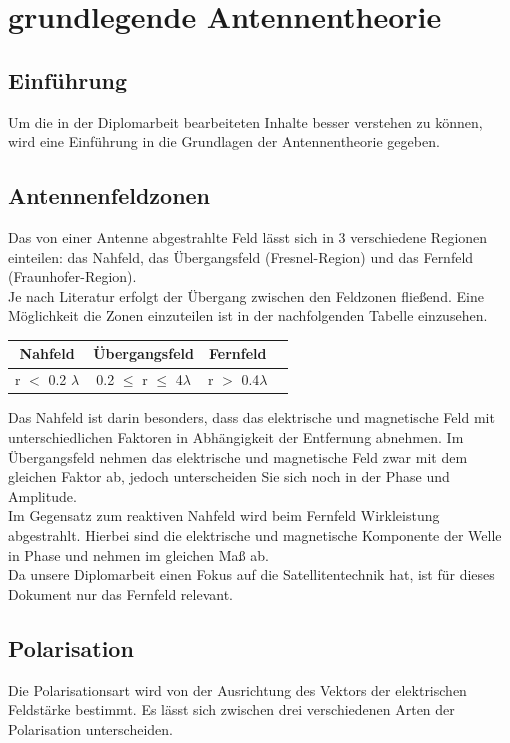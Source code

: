 \section{grundlegende Antennentheorie}
\label{sec:basic-ant}
\subsection{Einführung}
Um die in der Diplomarbeit bearbeiteten Inhalte besser verstehen zu können, wird eine Einführung in die Grundlagen der Antennentheorie gegeben. 

\subsection{Antennenfeldzonen}
Das von einer Antenne abgestrahlte Feld lässt sich in 3 verschiedene Regionen einteilen: das Nahfeld, das Übergangsfeld (Fresnel-Region) und das Fernfeld (Fraunhofer-Region).\\
\newline
Je nach Literatur erfolgt der Übergang zwischen den Feldzonen fließend. Eine Möglichkeit die Zonen einzuteilen ist in der nachfolgenden Tabelle einzusehen.

\begin{center}
	\begin{tabular}[h]{|c|c|c| p{}}
		\hline
		Nahfeld & Übergangsfeld & Fernfeld\\
		\hline
		r $<$ 0.2 $\lambda$ & 0.2 $\leq$ r $\leq$ 4$\lambda$ & r $>$ 0.4$\lambda$\\
		\hline
	\end{tabular}
\end{center}

Das Nahfeld ist darin besonders, dass das elektrische und magnetische Feld mit unterschiedlichen Faktoren in Abhängigkeit der Entfernung abnehmen. Im Übergangsfeld nehmen das elektrische und magnetische Feld zwar mit dem gleichen Faktor ab, jedoch unterscheiden Sie sich noch in der Phase und Amplitude.\\
\newline
Im Gegensatz zum reaktiven Nahfeld wird beim Fernfeld Wirkleistung abgestrahlt. Hierbei sind die elektrische und magnetische Komponente der Welle in Phase und nehmen im gleichen Maß ab.\\
\newline
Da unsere Diplomarbeit einen Fokus auf die Satellitentechnik hat, ist für dieses Dokument nur das Fernfeld relevant. 

\subsection{Polarisation}
Die Polarisationsart wird von der Ausrichtung des Vektors der elektrischen Feldstärke bestimmt. Es lässt sich zwischen drei verschiedenen Arten der Polarisation unterscheiden.\\
\newline


